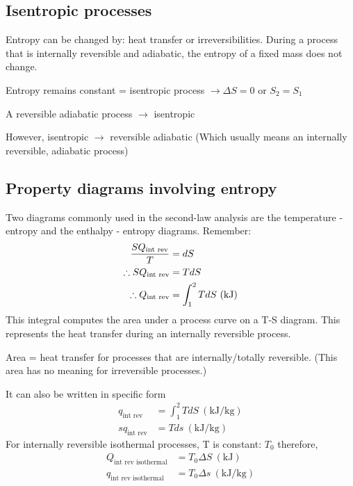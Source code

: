 \documentclass[class=report, crop=false, 12pt,a4paper]{standalone}
\numberwithin{equation}{section}
\begin{document}
\subsection{Isentropic processes}
Entropy can be changed by: heat transfer or irreversibilities. During a process that is internally reversible and adiabatic, the entropy of a fixed mass does not change.
\begin{center}
  Entropy remains constant = isentropic process \(\rightarrow \Delta S = 0 \textrm{ or } S_2 = S_1 \)
\end{center}
\begin{center}
  A reversible adiabatic process \(\rightarrow\) isentropic
\end{center}
\begin{center}
  However, isentropic \(\rightarrow\) reversible adiabatic (Which usually means an internally reversible, adiabatic process)
\end{center}
\subsection{Property diagrams involving entropy}
Two diagrams commonly used in the second-law analysis are the temperature - entropy and the enthalpy - entropy diagrams. Remember:
\begin{align}
  \frac{SQ_{\textrm{int rev}}}{T} &= dS\\
  \therefore SQ_{\textrm{\textrm{int rev}}} &= TdS\\
  \therefore Q_{\textrm{int rev}} &= \int_1^2 T dS \ (\si{\kilo\joule})
\end{align}
This integral computes the area under a process curve on a T-S diagram. This represents the heat transfer during an internally reversible process.
\begin{center}
  Area = heat transfer for processes that are internally/totally reversible. (This area has no meaning for irreversible processes.)
\end{center}
It can also be written in specific form
\begin{align}
  q_{\textrm{int rev}} &= \int_1^2 TdS \ (\si{\kilo\joule\per\kg})\\
  sq_{\textrm{int rev}} &= T ds \ (\si{\kilo\joule\per\kg})
\end{align}
For internally reversible isothermal processes, T is constant: \(T_0\) therefore,
\begin{align}
  Q_{\textrm{int rev isothermal}} &= T_0 \Delta S \ (\si{\kilo\joule})\\
  q_{\textrm{int rev isothermal}} &= T_0 \Delta s \ (\si{\kilo\joule\per\kg})
\end{align}
\end{document}
